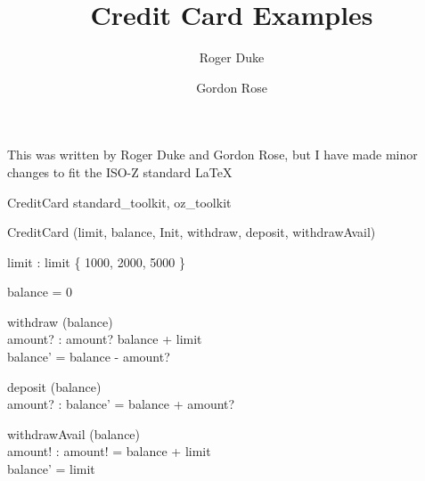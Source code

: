 \documentclass[12pt]{article}
\begin{document}
\title{Credit Card Examples}
\author{Roger Duke \and Gordon Rose}
\date{}
\maketitle

This was written by Roger Duke and Gordon Rose, but I have made
minor changes to fit the ISO-Z standard LaTeX

\begin{zsection}
  \SECTION CreditCard \parents standard\_toolkit, oz\_toolkit
\end{zsection}

\begin{class}{CreditCard} 
\also
        \project (limit, balance, Init, withdraw, deposit, withdrawAvail) \\
        \begin{axdef}
		limit : \nat
	\where
		limit \in \{ 1000, 2000, 5000 \}
	\end{axdef}\classbreak
	 \classbreak
	\begin{init}
		balance = 0
	\end{init} \classbreak
	\begin{op}{withdraw}
		\Delta (balance) \\
		amount? : \nat
	\where
		amount? \leq balance + limit \\
		balance' = balance - amount?
	\end{op} \classbreak
	\begin{op}{deposit}
		\Delta (balance) \\
		amount? : \nat
	\where
		balance' = balance + amount?
	\end{op} \classbreak
	\begin{op}{withdrawAvail}
		\Delta (balance) \\
		amount! : \nat
	\where
		amount! = balance + limit \\
		balance' = \negate limit
	\end{op}	
\end{class}
\end{document}
